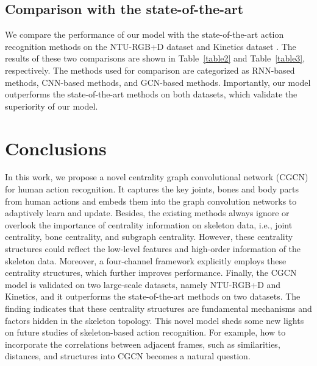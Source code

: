 \documentclass[runningheads]{llncs}
\begin{document}
\subsection{Comparison with the state-of-the-art}
We compare the performance of our model with the state-of-the-art action recognition methods on the
NTU-RGB+D dataset \cite{du2015hierarchical,Shahroudy_2016_NTURGBD,liu2017two,liu2016spatio,song2017end,zhang2017view,li2018skeleton,li2018independently,kim2017interpretable,ke2017new,liu2017enhanced,yan2018spatial,du2015skeleton,li2017skeleton,tang2018deep,shi2019two} and Kinetics dataset \cite{fernando2015modeling,Shahroudy_2016_NTURGBD,kim2017interpretable,yan2018spatial,Li_2019_CVPR,shi2019two}. The results of these two comparisons are shown in Table~\ref{table2} and Table~\ref{table3}, respectively. The methods used for comparison are categorized as RNN-based methods, CNN-based methods, and GCN-based methods. Importantly, our model outperforms the state-of-the-art methods on both datasets, which validate the superiority of our model.

\section{Conclusions}

In this work, we propose a novel centrality graph convolutional network (CGCN) for human action recognition. It captures the key joints, bones and body parts from human actions and embeds them into the graph convolution networks to adaptively learn and update. Besides, the existing methods always ignore or overlook the importance of centrality information on skeleton data, i.e., joint centrality, bone centrality, and subgraph centrality. However, these centrality structures could reflect the low-level features and high-order information of the skeleton data. Moreover, a four-channel framework explicitly employs these centrality structures, which further improves performance. Finally, the CGCN model is validated on two large-scale datasets, namely NTU-RGB+D and Kinetics, and it outperforms the state-of-the-art methods on two datasets. The finding indicates that these centrality structures are fundamental mechanisms and factors hidden in the skeleton topology. This novel model sheds some new lights on future studies of skeleton-based action recognition. For example, how to incorporate the correlations between adjacent frames, such as similarities, distances, and structures into CGCN becomes a natural question.


\clearpage



\end{document}
